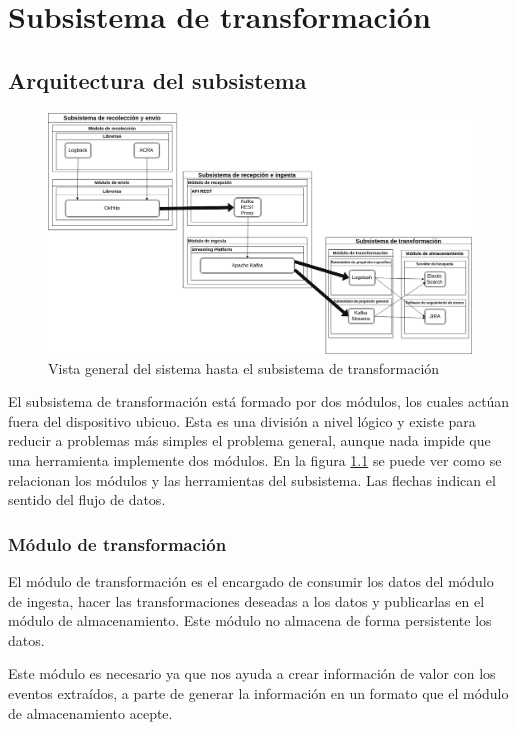 \chapter{Subsistema de transformación}

\section{Arquitectura del subsistema}

\begin{figure}[!htb]
	\includegraphics[width=\linewidth]{Moduloss-subtran.png}
	\caption{Vista general del sistema hasta el subsistema de transformación}
	\label{fig:subtra}
\end{figure}

El subsistema de transformación está formado por dos módulos, los cuales actúan fuera del dispositivo ubicuo. Esta es una división a nivel lógico y existe para reducir a problemas más simples el problema general, aunque nada impide que una herramienta implemente dos módulos. En la figura \ref{fig:subtra} se puede ver como se relacionan los módulos y las herramientas del subsistema. Las flechas indican el sentido del flujo de datos.

\subsection{Módulo de transformación}

El módulo de transformación es el encargado de consumir los datos del módulo de ingesta, hacer las transformaciones deseadas a los datos y publicarlas en el módulo de almacenamiento. Este módulo no almacena de forma persistente los datos.

Este módulo es necesario ya que nos ayuda a crear información de valor con los eventos extraídos, a parte de generar la información en un formato que el módulo de almacenamiento acepte.

